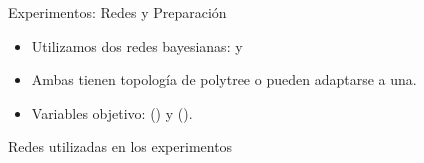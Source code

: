 \begin{frame}{Experimentos: Redes y Preparaci\'on}
	\begin{itemize}[<+-| alert@+>]
		\item Utilizamos dos redes bayesianas: \cancerNetwork{} y \childNetwork 
		\item Ambas tienen topolog\'ia de polytree o pueden adaptarse a una.
		\item Variables objetivo:  (\cancerNetwork) y  (\childNetwork).
	\end{itemize}
\end{frame}

\begin{frame}{Redes utilizadas en los experimentos}
	\begin{figure}[ht]
		\centering
		

\end{figure}
\end{frame}
